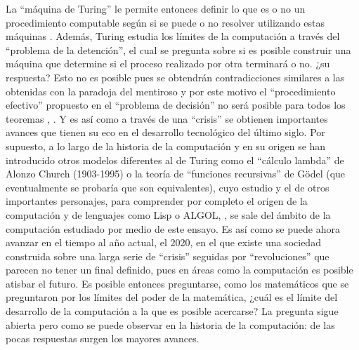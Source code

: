 \documentclass[a4paper,11pt]{article}
\begin{document}
La “máquina de Turing” le permite entonces definir lo que es o no un procedimiento computable según si se puede o no resolver utilizando estas máquinas \cite{hernández_2013}. Además, Turing estudia los límites de la computación a través del “problema de la detención”, el cual se pregunta sobre si es posible construir una máquina que determine si el proceso realizado por otra terminará o no. ¿su respuesta? Esto no es posible pues se obtendrán contradicciones similares a las obtenidas con la paradoja del mentiroso y por este motivo el “procedimiento efectivo” propuesto en el “problema de decisión” no será posible para todos los teoremas \cite{chaitin2003ordenadores}, \cite{hernández_2013}.
Y es así como a través de una “crisis” se obtienen importantes avances que tienen su eco en el desarrollo tecnológico del último siglo. Por supuesto, a lo largo de la historia de la computación y en su origen se han introducido otros modelos diferentes al de Turing como el “cálculo lambda” de Alonzo Church (1903-1995) o la teoría de “funciones recursivas” de Gödel (que eventualmente se probaría que son equivalentes), cuyo estudio y el de otros importantes personajes, para comprender por completo el origen de la computación y de lenguajes como Lisp o ALGOL,  \cite{hernández_2013}, \cite{baez2010physics} se sale del ámbito de la computación estudiado por medio de este ensayo.
Es así como se puede ahora avanzar en el tiempo al año actual, el 2020, en el que existe una sociedad construida sobre una larga serie de “crisis” seguidas por “revoluciones” que parecen no tener un final definido, pues en áreas como la computación es posible atisbar el futuro. Es posible entonces preguntarse, como los matemáticos que se preguntaron por los límites del poder de la matemática, ¿cuál es el límite del desarrollo de la computación a la que es posible acercarse? La pregunta sigue abierta pero como se puede observar en la historia de la computación: de las pocas respuestas surgen los mayores avances.  

\nocite{maestre_timón_2018}



\newpage

\renewcommand\refname{REFERENCIAS BIBLIOGRÁFICAS}
%


\end{document}
